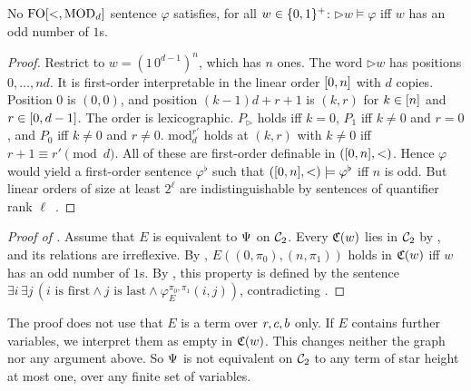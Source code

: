 \begin{lemma}\label{lemma: parity undefinable}
  No $\mathrm{FO}[<, \mathrm{MOD}_{d}]$ sentence $\varphi$ satisfies, for all $w \in \{0,1\}^{+}$: ${\triangleright} w \models \varphi$ iff $w$ has an odd number of $1$s.
\end{lemma}
\begin{proof}
  Restrict to $w = (1\, 0^{d-1})^{n}$, which has $n$ ones.
  The word ${\triangleright} w$ has positions $0, \dots, nd$.
  It is first-order interpretable in the linear order $[0, n]$ with $d$ copies.
  Position $0$ is $(0, 0)$, and position $(k-1)d + r + 1$ is $(k, r)$ for $k \in [n]$ and $r \in [0, d-1]$.
  The order is lexicographic.
  $P_{\triangleright}$ holds iff $k = 0$, $P_1$ iff $k \ne 0$ and $r = 0$, and $P_0$ iff $k \ne 0$ and $r \ne 0$.
  $\mathrm{mod}^{r'}_d$ holds at $(k, r)$ with $k \ne 0$ iff $r + 1 \equiv r' \pmod d$.
  All of these are first-order definable in $([0, n], <)$.
  Hence $\varphi$ would yield a first-order sentence $\varphi^{\flat}$ such that $([0, n], <) \models \varphi^{\flat}$ iff $n$ is odd.
  But linear orders of size at least $2^{\ell}$ are indistinguishable by sentences of quantifier rank $\ell$~\cite{ebbinghausFiniteModelTheory1995}.
\end{proof}

\begin{proof}[Proof of ]
  Assume that $E$ is equivalent to $\Psi$ on $\mathcal{C}_{2}$.
  Every $\mathfrak{C}(w)$ lies in $\mathcal{C}_{2}$ by , and its relations are irreflexive.
  By , $E((0, \pi_0), (n, \pi_1))$ holds in $\mathfrak{C}(w)$ iff $w$ has an odd number of $1$s.
  By , this property is defined by the sentence $\exists i\, \exists j\, (i \text{ is first} \wedge j \text{ is last} \wedge \varphi^{\pi_0, \pi_1}_{E}(i, j))$, contradicting .
\end{proof}

\begin{remark}\label{remark: more variables}
  The proof does not use that $E$ is a term over $r, c, b$ only.
  If $E$ contains further variables, we interpret them as empty in $\mathfrak{C}(w)$.
  This changes neither the graph nor any argument above.
  So $\Psi$ is not equivalent on $\mathcal{C}_{2}$ to any term of star height at most one, over any finite set of variables.
\end{remark}
